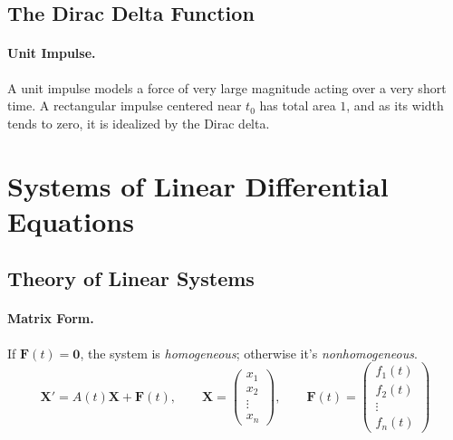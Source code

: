 \documentclass[oneside]{book}
\begin{document}
\subsection{The Dirac Delta Function}

\paragraph{Unit Impulse.}
A unit impulse models a force of very large magnitude acting over a very short time.
A rectangular impulse centered near $t_0$ has total area $1$, and as its width tends
to zero, it is idealized by the Dirac delta.




\section{Systems of Linear Differential Equations}

\subsection{Theory of Linear Systems}


\paragraph{Matrix Form.} If $\mathbf{F}(t)=\mathbf{0}$, the system is \emph{homogeneous}; otherwise it's \emph{nonhomogeneous}.
\[
    \mathbf{X}'=A(t)\mathbf{X}+\mathbf{F}(t), \qquad \mathbf{X}=\begin{pmatrix}x_1\\x_2\\\vdots\\x_n\end{pmatrix},
    \qquad
    \mathbf{F}(t)=\begin{pmatrix}f_1(t)\\f_2(t)\\\vdots\\f_n(t)\end{pmatrix}
\]
\end{document}
